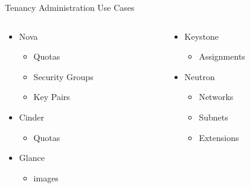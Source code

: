 \documentclass{beamer}
\begin{document}
\begin{frame}{Tenancy Administration Use Cases}
  \begin{columns}[t,onlytextwidth]

    \begin{column}{.5\textwidth}
      \begin{itemize}
      \item Nova
        \begin{itemize}
        \item Quotas
        \item Security Groups
        \item Key Pairs
        \end{itemize}
      \item Cinder
        \begin{itemize}
        \item Quotas
        \end{itemize}
      \item Glance
        \begin{itemize}
        \item images
        \end{itemize}
      \end{itemize}
    \end{column}

    \begin{column}{.5\textwidth}
      \begin{itemize}
      \item Keystone
        \begin{itemize}
        \item Assignments
        \end{itemize}

      \item Neutron
        \begin{itemize}
        \item Networks
        \item Subnets
        \item Extensions
        \end{itemize}
      \end{itemize}
    \end{column}
  \end{columns}
\end{frame}
\end{document}
